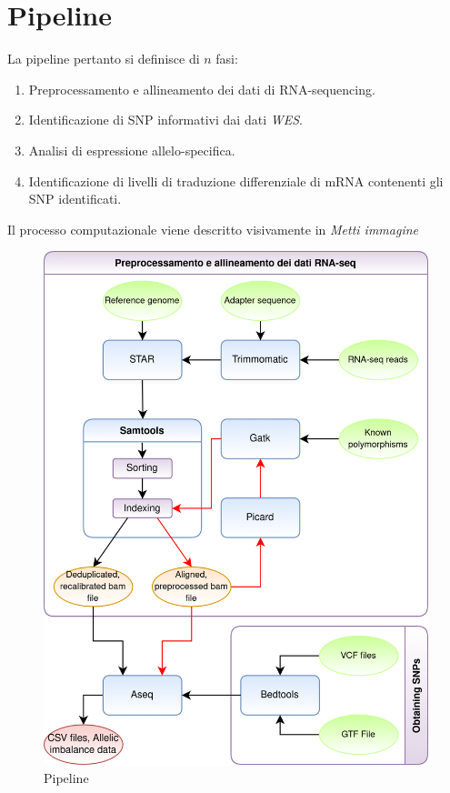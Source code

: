   \section{Pipeline}
  \label{sec:pipeline}
  La pipeline pertanto si definisce di $n$ fasi:
  \begin{multicols}{2}
    \begin{enumerate}
      \item Preprocessamento e allineamento dei dati di RNA-sequencing.
      \item Identificazione di SNP informativi dai dati \emph{WES}.
      \item Analisi di espressione allelo-specifica.
      \item Identificazione di livelli di traduzione differenziale di mRNA contenenti gli SNP identificati.
    \end{enumerate}
  \end{multicols}
  Il processo computazionale viene descritto visivamente in \emph{Metti immagine}
  \begin{figure}[H]
    \centering
    \includegraphics[scale=0.]{pipeline.png}
    \caption{Pipeline}
  \end{figure}
